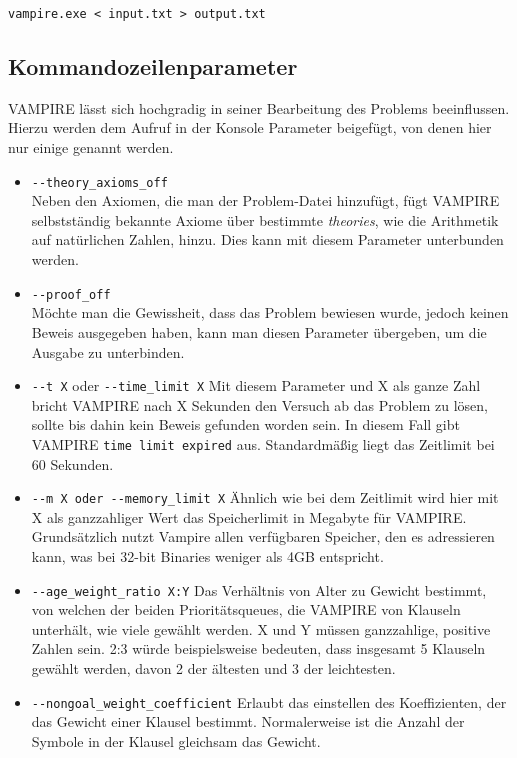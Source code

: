\documentclass{article}
\begin{document}
\texttt{vampire.exe < input.txt > output.txt}

\subsection{Kommandozeilenparameter}
\label{subsec:commands}
VAMPIRE lässt sich hochgradig in seiner Bearbeitung des Problems beeinflussen. Hierzu werden dem Aufruf in der Konsole Parameter beigefügt, von denen hier nur einige genannt werden.
\begin{itemize}
	\item \verb|--theory_axioms_off| \label{arg:theoryaxiomsoff}\\
	Neben den Axiomen, die man der Problem-Datei hinzufügt, fügt VAMPIRE selbstständig bekannte 
	Axiome über bestimmte \emph{theories}, wie die Arithmetik auf natürlichen Zahlen, hinzu. 
	Dies kann mit diesem Parameter unterbunden werden.
	\item \verb|--proof_off| \label{arg:proofoff}\\
	Möchte man die Gewissheit, dass das Problem bewiesen wurde, jedoch keinen Beweis ausgegeben haben, kann man diesen Parameter übergeben, um die Ausgabe zu unterbinden.



\item \verb|--t X| oder \verb|--time_limit X| \label{arg:timelimit}
Mit diesem Parameter und X als ganze Zahl bricht VAMPIRE nach X Sekunden den Versuch ab das Problem zu lösen, sollte bis dahin kein Beweis gefunden worden sein.
In diesem Fall gibt VAMPIRE \texttt{time limit expired} aus. Standardmäßig liegt das Zeitlimit bei 60  Sekunden.

\item \verb|--m X oder --memory_limit X| \label{arg:memorylimit}
Ähnlich wie bei dem Zeitlimit wird hier mit X als ganzzahliger Wert das Speicherlimit in Megabyte für VAMPIRE. Grundsätzlich nutzt Vampire allen verfügbaren Speicher, den es adressieren kann, was bei 32-bit Binaries weniger als 4GB entspricht.

\item \verb|--age_weight_ratio X:Y| \label{arg:ageweightratio}
Das Verhältnis von Alter zu Gewicht bestimmt, von welchen der beiden Prioritätsqueues, die VAMPIRE von Klauseln unterhält, wie viele gewählt werden. X und Y müssen ganzzahlige, positive Zahlen sein.
2:3 würde beispielsweise bedeuten, dass insgesamt 5 Klauseln gewählt werden, davon 2 der ältesten und 3 der leichtesten. 

\item \verb|--nongoal_weight_coefficient| \label{arg:weightcoefficient}
Erlaubt das einstellen des Koeffizienten, der das Gewicht einer Klausel bestimmt. Normalerweise ist die Anzahl der Symbole in der Klausel gleichsam das Gewicht.


\end{itemize}
\end{document}
